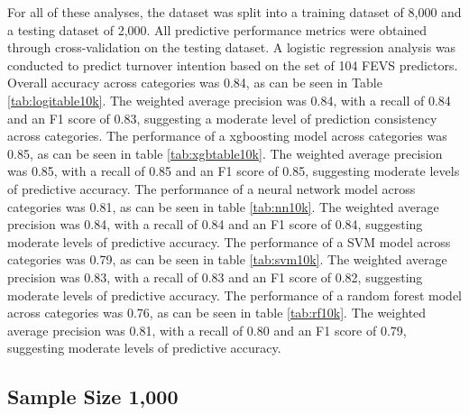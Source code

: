 \documentclass[
  man]{apa7}
\begin{document}
For all of these analyses, the dataset was split into a training dataset of 8,000 and a testing dataset of 2,000. All predictive performance metrics were obtained through cross-validation on the testing dataset. A logistic regression analysis was conducted to predict turnover intention based on the set of 104 FEVS predictors. Overall accuracy across categories was 0.84, as can be seen in Table \ref{tab:logitable10k}. The weighted average precision was 0.84, with a recall of 0.84 and an F1 score of 0.83, suggesting a moderate level of prediction consistency across categories.
The performance of a xgboosting model across categories was 0.85, as can be seen in table \ref{tab:xgbtable10k}. The weighted average precision was 0.85, with a recall of 0.85 and an F1 score of 0.85, suggesting moderate levels of predictive accuracy.
The performance of a neural network model across categories was 0.81, as can be seen in table \ref{tab:nn10k}. The weighted average precision was 0.84, with a recall of 0.84 and an F1 score of 0.84, suggesting moderate levels of predictive accuracy.
The performance of a SVM model across categories was 0.79, as can be seen in table \ref{tab:svm10k}. The weighted average precision was 0.83, with a recall of 0.83 and an F1 score of 0.82, suggesting moderate levels of predictive accuracy.
The performance of a random forest model across categories was 0.76, as can be seen in table \ref{tab:rf10k}. The weighted average precision was 0.81, with a recall of 0.80 and an F1 score of 0.79, suggesting moderate levels of predictive accuracy.

\subsection{Sample Size 1,000}\label{sample-size-1000}
\end{document}
